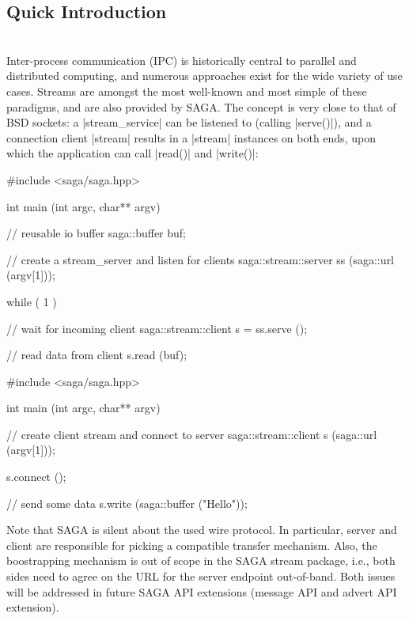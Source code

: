 

 \subsection{Quick Introduction}

  \\
  Inter-process communication (IPC) is historically central to
  parallel and distributed computing, and numerous approaches exist
  for the wide variety of use cases.  Streams are amongst the most
  well-known and most simple of these paradigms, and are also provided
  by SAGA.  The concept is very close to that of BSD sockets: a
  |stream_service| can be listened to (calling |serve()|), and a
  connection client |stream| results in a |stream| instances on both
  ends, upon which the application can call |read()| and |write()|:


  \begin{mycode}[label=Stream server]
  #include <saga/saga.hpp>

  int main (int argc, char** argv)
  {
    // reusable io buffer
    saga::buffer buf;

    // create a stream_server and listen for clients
    saga::stream::server ss (saga::url (argv[1]));

    while ( 1 )
    {
      // wait for incoming client
      saga::stream::client s = ss.serve ();
      
      // read data from client
      s.read (buf);
    }
  }
  \end{mycode}
  \begin{mycode}[label=Stream client]
  #include <saga/saga.hpp>

  int main (int argc, char** argv)
  {
    // create client stream and connect to server
    saga::stream::client s (saga::url (argv[1]));

    s.connect ();

    // send some data
    s.write (saga::buffer ("Hello"));
  }
  \end{mycode}


  Note that SAGA is silent about the used wire protocol.  In
  particular, server and client are responsible for picking a compatible
  transfer mechanism.  Also, the boostrapping mechanism is out of
  scope in the SAGA stream package, i.e., both sides need to agree on
  the URL for the server endpoint out-of-band.  Both issues will be
  addressed in future SAGA API extensions (message API and advert API
  extension).

